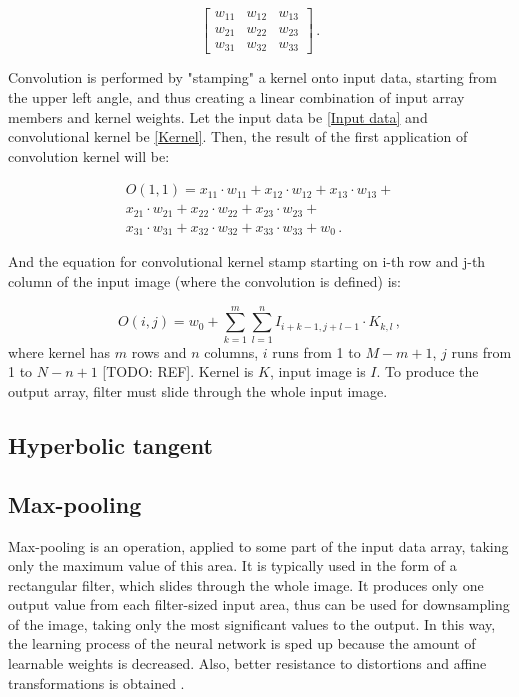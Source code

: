 \begin{equation}
	\begin{bmatrix}
    w_{11}       & w_{12} & w_{13} \\
    w_{21}       & w_{22} & w_{23} \\
    w_{31}       & w_{32} & w_{33} 
	\end{bmatrix}\,.
\label{Kernel}
\end{equation}

Convolution is performed by "stamping" a kernel onto input data, starting from the upper left angle, and thus creating a linear combination of input array members and kernel weights. Let the input data be \eqref{Input data} and convolutional kernel be \eqref{Kernel}. Then, the result of the first application of convolution kernel will be:

\begin{equation}
\begin{aligned}
	O(1, 1) = x_{11}\cdot w_{11} + x_{12}\cdot w_{12} + x_{13}\cdot w_{13} +\\
	x_{21}\cdot w_{21} + x_{22}\cdot w_{22} + x_{23}\cdot w_{23} + \\
	x_{31}\cdot w_{31} + x_{32}\cdot w_{32} + x_{33}\cdot w_{33} + w_0\,.
\end{aligned}
\end{equation}

And the equation for convolutional kernel stamp starting on i-th row and j-th column of the input image (where the convolution is defined) is:

\begin{equation}
	O(i, j) = w_0 + \sum\limits_{k=1}^m \sum\limits_{l=1}^n I_{i+k-1, j+l-1}\cdot K_{k, l} \,,
\end{equation}
where kernel has $m$ rows and $n$ columns, $i$ runs from 1 to $M-m+1$, $j$ runs from 1 to $N-n+1$ [TODO: REF]. Kernel is $K$, input image is $I$. To produce the output array, filter must slide through the whole input image.


\subsection{Hyperbolic tangent}




\subsection{Max-pooling}

Max-pooling is an operation, applied to some part of the input data array, taking only the maximum value of this area. It is typically used in the form of a rectangular filter, which slides through the whole image. It produces only one output value from each filter-sized input area, thus can be used for downsampling of the image, taking only the most significant values to the output. In this way, the learning process of the neural network is sped up because the amount of learnable weights is decreased. Also, better resistance to distortions and affine transformations is obtained \cite{yu2014mixed}.

